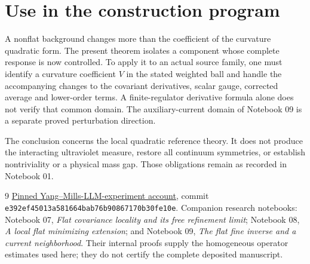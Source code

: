 \documentclass[11pt]{article}
\theoremstyle{remark}
\begin{document}
\section{Use in the construction program}

A nonflat background changes more than the coefficient of the
curvature quadratic form. The present theorem isolates a component
whose complete response is now controlled. To apply it to an actual
source family, one must identify a curvature coefficient $V$ in the
stated weighted ball and handle the accompanying changes to the
covariant derivatives, scalar gauge, corrected average and lower-order
terms. A finite-regulator derivative formula alone does not verify
that common domain. The auxiliary-current domain of Notebook 09 is a
separate proved perturbation direction.

The conclusion concerns the local quadratic reference theory. It
does not produce the interacting ultraviolet measure, restore all
continuum symmetries, or establish nontriviality or a physical mass gap.
Those obligations remain as recorded in Notebook 01.

\begin{thebibliography}{9}
\href{https://github.com/ethanwsussman/Yang--Mills-LLM-experiment/tree/e392ef45013a581664bab76b90867170b30fe10e}
{Pinned Yang--Mills-LLM-experiment account}, commit
\texttt{e392ef4501\allowbreak 3a581664ba\allowbreak b76b908671\allowbreak 70b30fe10e}.
Companion research notebooks: Notebook 07,
\emph{Flat covariance locality and its free refinement limit};
Notebook 08, \emph{A local flat minimizing extension}; and Notebook 09,
\emph{The flat fine inverse and a current neighborhood}.
Their internal proofs supply the homogeneous operator estimates
used here; they do not certify the complete deposited manuscript.
\end{thebibliography}
\end{document}
